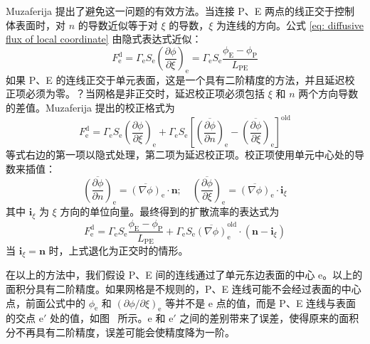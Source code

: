 Muzaferija\cite{} 提出了避免这一问题的有效方法。当连接 P、E 两点的线正交于控制体表面时，对 $n$ 的导数近似等于对 $\xi$ 的导数，$\xi$ 为连线的方向。公式 \eqref{eq: diffusive flux of local coordinate} 由隐式表达式近似：
\begin{equation}
	F_{\mathrm{e}}^{\mathrm{d}} = \varGamma_{\mathrm{e}}S_{\mathrm{e}}\left(\frac{\partial\phi}{\partial\xi}\right)_{\mathrm{e}} = 
	\varGamma_{\mathrm{e}}S_{\mathrm{e}}\frac{\phi_{\mathrm{E}}-\phi_{\mathrm{P}}}{L_{\mathrm{PE}}}
\end{equation}
如果 P、E 的连线正交于单元表面，这是一个具有二阶精度的方法，并且延迟校正项必须为零。？当网格是非正交时，延迟校正项必须包括 $\xi$ 和 $n$ 两个方向导数的差值。Muzaferija\cite{} 提出的校正格式为
\begin{equation}\label{eq: Muzaferija1994 formula}
	F_{\mathrm{e}}^{\mathrm{d}} = \varGamma_{\mathrm{e}}S_{\mathrm{e}}\left(\frac{\partial\phi}{\partial\xi}\right)_{\mathrm{e}} +
	\varGamma_{\mathrm{e}}S_{\mathrm{e}}\left[ 
	\overline{\left(\frac{\partial\phi}{\partial n}\right)}_{\mathrm{e}} - 
	\overline{\left(\frac{\partial\phi}{\partial\xi}\right)}_{\mathrm{e}} \right]^{\mathrm{old}}
\end{equation}
等式右边的第一项以隐式处理，第二项为延迟校正项。校正项使用单元中心处的导数来插值：
\begin{equation}
	\overline{\left(\frac{\partial\phi}{\partial n}\right)}_{\mathrm{e}} =
	\overline{(\nabla\phi)}_{\mathrm{e}}\cdot\bm{n}; \quad
	\overline{\left(\frac{\partial\phi}{\partial\xi}\right)}_{\mathrm{e}} =
	\overline{(\nabla\phi)}_{\mathrm{e}}\cdot\bm{i}_{\xi}
\end{equation}
其中 $\bm{i}_{\xi}$ 为 $\xi$ 方向的单位向量。最终得到的扩散流率的表达式为
\begin{equation}
	F_{\mathrm{e}}^{\mathrm{d}} = \varGamma_{\mathrm{e}}S_{\mathrm{e}}\frac{\phi_{\mathrm{E}}-\phi_{\mathrm{P}}}{L_{\mathrm{PE}}} +
	\varGamma_{\mathrm{e}}S_{\mathrm{e}}\overline{(\nabla\phi)}_{\mathrm{e}}^{\mathrm{old}}\cdot(\bm{n}-\bm{i}_{\xi})
\end{equation}
当 $\bm{i}_{\xi}=\bm{n}$ 时，上式退化为正交时的情形。

在以上的方法中，我们假设 P、E 间的连线通过了单元东边表面的中心 e。以上的面积分具有二阶精度。如果网格是不规则的，P、E 连线可能不会经过表面的中心点，前面公式中的 $\phi_{\mathrm{e}}$ 和 $(\partial\phi/\partial\xi)_{\mathrm{e}}$ 等并不是 e 点的值，而是 P、E 连线与表面的交点 $\mathrm{e}'$ 处的值，如图~ 所示。e 和 $\mathrm{e}'$ 之间的差别带来了误差，使得原来的面积分不再具有二阶精度，误差可能会使精度降为一阶。


